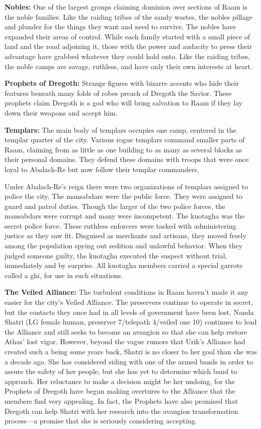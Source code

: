{	\textbf{Nobles:} One of the largest groups claiming dominion over sections of Raam is the noble families. Like the raiding tribes of the sandy wastes, the nobles pillage and plunder for the things they want and need to survive. The nobles have expanded their areas of control. While each family started with a small piece of land and the road adjoining it, those with the power and audacity to press their advantage have grabbed whatever they could hold onto. Like the raiding tribes, the noble camps are savage, ruthless, and have only their own interests at heart.

	\textbf{Prophets of Dregoth:} Strange figures with bizarre accents who hide their features beneath many folds of robes preach of Dregoth the Savior. These prophets claim Dregoth is a god who will bring salvation to Raam if they lay down their weapons and accept him.

	\textbf{Templars:} The main body of templars occupies one camp, centered in the templar quarter of the city. Various rogue templars command smaller parts of Raam, claiming from as little as one building to as many as several blocks as their personal domains. They defend these domains with troops that were once loyal to Abalach-Re but now follow their templar commanders.

	Under Abalach-Re's reign there were two organizations of templars assigned to police the city. The mansabdars were the public force. They were assigned to guard and patrol duties. Though the larger of the two police forces, the mansabdars were corrupt and many were incompetent. The kuotagha was the secret police force. These ruthless enforcers were tasked with administering justice as they saw fit. Disguised as merchants and artisans, they moved freely among the population spying out sedition and unlawful behavior. When they judged someone guilty, the kuotagha executed the suspect without trial, immediately and by surprise. All kuotagha members carried a special garrote called a ghi, for use in such situations.

	\textbf{The Veiled Alliance:} The turbulent conditions in Raam haven't made it any easier for the city's Veiled Alliance. The preservers continue to operate in secret, but the contacts they once had in all levels of government have been lost. Nanda Shatri (LG female human, preserver 7/telepath 4/veiled one 10) continues to lead the Alliance and still seeks to become an avangion so that she can help restore Athas' lost vigor. However, beyond the vague rumors that Urik's Alliance had created such a being some years back, Shatri is no closer to her goal than she was a decade ago. She has considered siding with one of the armed bands in order to assure the safety of her people, but she has yet to determine which band to approach. Her reluctance to make a decision might be her undoing, for the Prophets of Dregoth have begun making overtures to the Alliance that the members find very appealing. In fact, the Prophets have also promised that Dregoth can help Shatri with her research into the avangion transformation process---a promise that she is seriously considering accepting.
}
